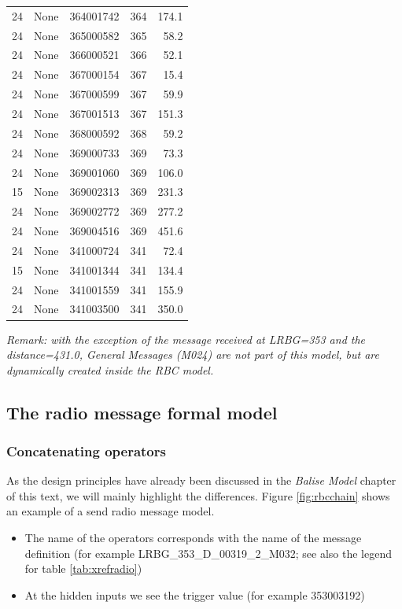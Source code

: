 \documentclass{template/openetcs_article}
\begin{document}
\begin{longtable}{|l |l |l |l |r |}
24 & None & 364001742 & 364 & 174.1 \\
24 & None & 365000582 & 365 & 58.2 \\
24 & None & 366000521 & 366 & 52.1 \\
24 & None & 367000154 & 367 & 15.4 \\
24 & None & 367000599 & 367 & 59.9 \\
24 & None & 367001513 & 367 & 151.3 \\
24 & None & 368000592 & 368 & 59.2 \\
24 & None & 369000733 & 369 & 73.3 \\
24 & None & 369001060 & 369 & 106.0 \\
15 & None & 369002313 & 369 & 231.3 \\
24 & None & 369002772 & 369 & 277.2 \\
24 & None & 369004516 & 369 & 451.6 \\
24 & None & 341000724 & 341 & 72.4 \\
15 & None & 341001344 & 341 & 134.4 \\
24 & None & 341001559 & 341 & 155.9 \\
24 & None & 341003500 & 341 & 350.0 \\

\end{longtable}


\emph{Remark: with the exception of the message received at LRBG=353 and the distance=431.0, General Messages (M024) are not part of this model, but are dynamically created inside the RBC model.}

\subsection{The radio message formal model}
\subsubsection{Concatenating operators}
As the design principles have already been discussed in the \emph{Balise Model} chapter of this text, we will mainly highlight the differences. Figure \ref{fig:rbcchain} shows an example of a send radio message model.
\begin{itemize}
 \item The name of the operators corresponds with the name of the message definition (for example LRBG\_353\_D\_00319\_2\_M032; see also the legend for table \ref{tab:xrefradio})
 \item At the hidden inputs we see the trigger value (for example 353003192)
\end{itemize}
 
\end{document}
